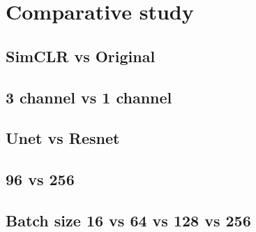 \chapter{Comparative study}\label{ch:Comparative study}
\section{SimCLR vs Original}
\section{3 channel vs 1 channel}
\section{Unet vs Resnet}

\section{96 vs 256}
\section{Batch size 16 vs 64 vs 128 vs 256}

